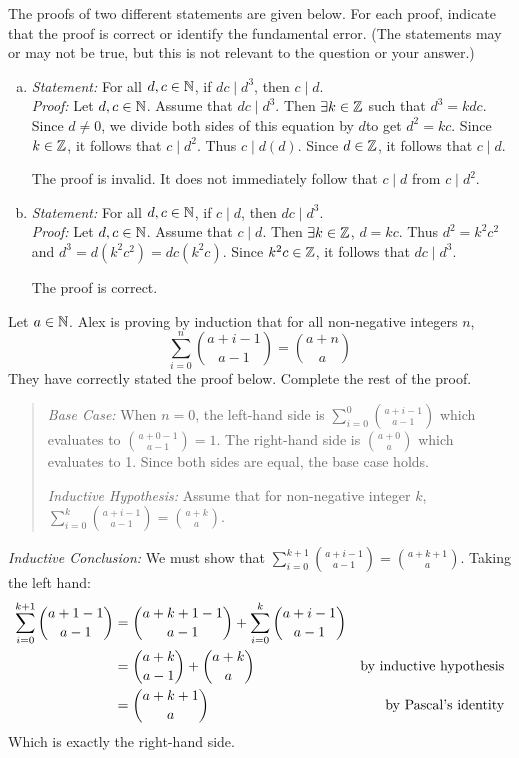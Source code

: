 \documentclass{agony}
\begin{document}
\question The proofs of two different statements are given below.
For each proof, indicate that the proof is correct or identify the fundamental error.
(The statements may or may not be true, but this is not relevant to the question or your answer.)
\begin{enumerate}[(a)]
  \item \emph{Statement:} For all $d,c\in\mathbb{N}$, if $dc \mid d^3$, then $c \mid d$. \\
        \emph{Proof:} Let $d,c\in\mathbb{N}$. Assume that $dc \mid d^3$.
        Then $\exists k\in\mathbb{Z}$ such that $d^3 = kdc$.
        Since $d \neq 0$, we divide both sides of this equation by $d $to get $d^2 = kc$.
        Since $k \in \mathbb{Z}$, it follows that $c \mid d^2$. Thus $c \mid d(d)$.
        Since $d \in \mathbb{Z}$, it follows that $c \mid d$.

        The proof is invalid. It does not immediately follow that $c \mid d$ from $c \mid d^2$.
  \item \emph{Statement:} For all $d,c\in\mathbb{N}$, if $c \mid d$, then $dc \mid d^3$. \\
        \emph{Proof:} Let $d,c\in\mathbb{N}$. Assume that $c \mid d$.
        Then $\exists k \in \mathbb{Z}$, $d=kc$.
        Thus $d^2=k^2c^2$ and $d^3=d(k^2c^2)=dc(k^2c)$.
        Since $k^2c\in\mathbb{Z}$, it follows that $dc \mid d^3$.

        The proof is correct.
\end{enumerate}


\question Let $a \in \mathbb{N}$. Alex is proving by induction that for all non-negative integers $n$,
\begin{equation*}
  \sum_{i=0}^n\binom{a+i-1}{a-1} = \binom{a+n}{a}
\end{equation*}
They have correctly stated the proof below. Complete the rest of the proof.

\begin{quote}
  \emph{Base Case:} When $n=0$, the left-hand side is $\sum^0_{i=0}\binom{a+i-1}{a-1}$
  which evaluates to $\binom{a+0-1}{a-1}=1$.
  The right-hand side is $\binom{a+0}{a}$ which evaluates to 1.
  Since both sides are equal, the base case holds.

  \emph{Inductive Hypothesis:} Assume that for non-negative integer $k$,
  $\sum_{i=0}^k\binom{a+i-1}{a-1}=\binom{a+k}{a}$.
\end{quote}

\emph{Inductive Conclusion:}
We must show that $\sum_{i=0}^{k+1}\binom{a+i-1}{a-1} = \binom{a+k+1}{a}$.
Taking the left hand:
\begin{align*}
  \sum_{i=0}^{k+1}\binom{a+1-1}{a-1} & = \binom{a+k+1-1}{a-1} + \sum_{i=0}^{k}\binom{a+i-1}{a-1} \\
                                     & = \binom{a+k}{a-1} + \binom{a+k}{a} & \text{by inductive hypothesis}                   \\
                                     & = \binom{a+k+1}{a} & \text{by Pascal's identity}
\end{align*}
Which is exactly the right-hand side.
\end{document}
